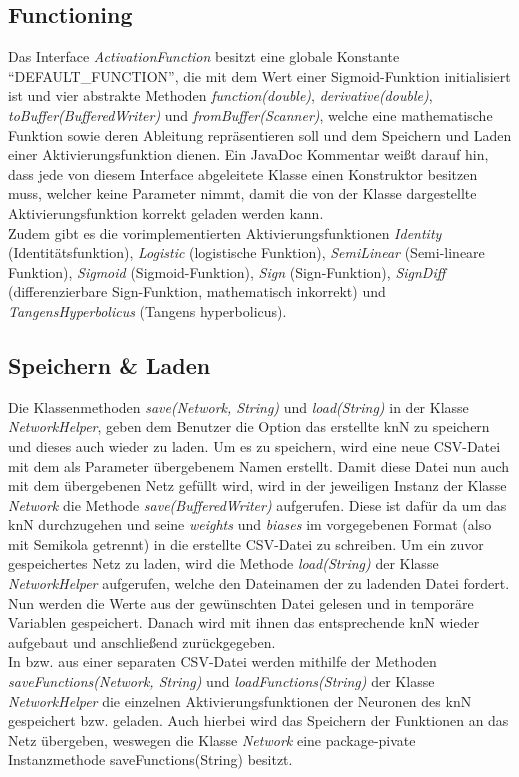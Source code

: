 \documentclass[paper=A4,pagesize=auto,12pt,headinclude=true,footinclude=true,BCOR=0mm,DIV=calc]{scrartcl}
\begin{document}
\hypertarget{functioning}{\subsection{Functioning}}
Das Interface \textit{ActivationFunction} besitzt eine globale Konstante “DEFAULT\_FUNCTION”, die mit dem Wert einer Sigmoid-Funktion initialisiert ist und vier abstrakte Methoden \textit{function(double)}, \textit{derivative(double)}, \textit{toBuffer(BufferedWriter)} und \textit{fromBuffer(Scanner)}, welche eine mathematische Funktion sowie deren Ableitung repräsentieren soll und dem Speichern und Laden einer Aktivierungsfunktion dienen. Ein JavaDoc Kommentar weißt darauf hin, dass jede von diesem Interface abgeleitete Klasse einen Konstruktor besitzen muss, welcher keine Parameter nimmt, damit die von der Klasse dargestellte Aktivierungsfunktion korrekt geladen werden kann. \\
Zudem gibt es die vorimplementierten Aktivierungsfunktionen \textit{Identity} (Identitätsfunktion), \textit{Logistic} (logistische Funktion), \textit{SemiLinear} (Semi-lineare Funktion), \textit{Sigmoid} (Sigmoid-Funktion), \textit{Sign} (Sign-Funktion), \textit{SignDiff} (differenzierbare Sign-Funktion, mathematisch inkorrekt) und \textit{TangensHyperbolicus} (Tangens hyperbolicus).


\subsection{Speichern \& Laden}
Die Klassenmethoden \textit{save(Network, String)} und \textit{load(String)} in der Klasse \textit{NetworkHelper}, geben dem Benutzer die Option das erstellte knN zu speichern und dieses auch wieder zu laden. Um es zu speichern, wird eine neue CSV-Datei mit dem als Parameter übergebenem Namen erstellt. Damit diese Datei nun auch mit dem übergebenen Netz gefüllt wird, wird in der jeweiligen Instanz der Klasse \textit{Network} die Methode \textit{save(BufferedWriter)} aufgerufen. Diese ist dafür da um das knN durchzugehen und seine \textit{weights} und \textit{biases} im vorgegebenen Format (also mit Semikola getrennt) in die erstellte CSV-Datei zu schreiben. Um ein zuvor gespeichertes Netz zu laden, wird die Methode \textit{load(String)} der Klasse \textit{NetworkHelper} aufgerufen, welche den Dateinamen der zu ladenden Datei fordert. Nun werden die Werte aus der gewünschten Datei gelesen und in temporäre Variablen gespeichert. Danach wird mit ihnen das entsprechende knN wieder aufgebaut und anschließend zurückgegeben.
\\
In bzw. aus einer separaten CSV-Datei werden mithilfe der Methoden \textit{saveFunctions(Network, String)} und \textit{loadFunctions(String)} der Klasse \textit{NetworkHelper} die einzelnen Aktivierungsfunktionen der Neuronen des knN gespeichert bzw. geladen. Auch hierbei wird das Speichern der Funktionen an das Netz übergeben, weswegen die Klasse \textit{Network} eine package-pivate Instanzmethode saveFunctions(String) besitzt.
\end{document}
